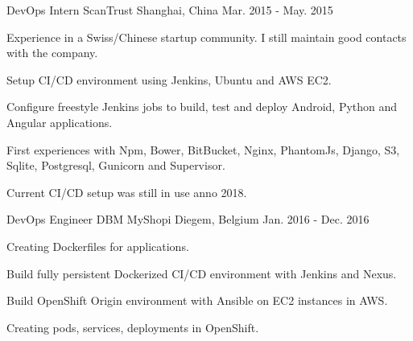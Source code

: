 

\begin{cventries}

  \cventry
    {DevOps Intern} %
    {ScanTrust} %
    {Shanghai, China} %
    {Mar. 2015 - May. 2015} %
    {
      \begin{cvitems} %
        \item {Experience in a Swiss/Chinese startup community. I still maintain good contacts with the company.}
        \item {Setup CI/CD environment using Jenkins, Ubuntu and AWS EC2.}
        \item {Configure freestyle Jenkins jobs to build, test and deploy Android, Python and Angular applications.}
        \item {First experiences with Npm, Bower, BitBucket, Nginx, PhantomJs, Django, S3, Sqlite, Postgresql, Gunicorn and Supervisor.}
        \item {Current CI/CD setup was still in use anno 2018.}
      \end{cvitems}
    }

  \cventry
    {DevOps Engineer} %
    {DBM MyShopi} %
    {Diegem, Belgium} %
    {Jan. 2016 - Dec. 2016} %
    {
      \begin{cvitems} %
        \item {Creating Dockerfiles for applications.}
        \item {Build fully persistent Dockerized CI/CD environment with Jenkins and Nexus.}
        \item {Build OpenShift Origin environment with Ansible on EC2 instances in AWS.}
        \item {Creating pods, services, deployments in OpenShift.}
      \end{cvitems}
    }


\end{cventries}
